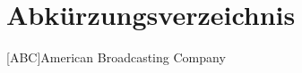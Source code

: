 \section*{Abkürzungsverzeichnis}

\begin{acronym}[CI]

[ABC]{American Broadcasting Company}

\end{acronym}